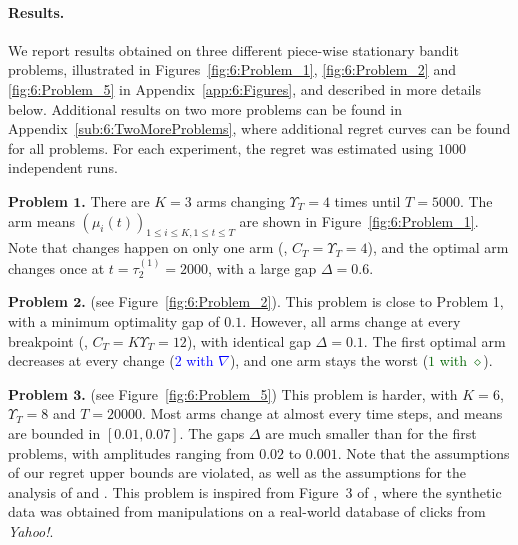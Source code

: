 \paragraph{Results.}
\label{sub:6:NumericalResults}

We report results obtained on three different piece-wise stationary bandit problems, illustrated in Figures~\ref{fig:6:Problem_1}, \ref{fig:6:Problem_2} and \ref{fig:6:Problem_5} in Appendix~\ref{app:6:Figures}, and described in more details below. Additional results on two more problems can be found in Appendix~\ref{sub:6:TwoMoreProblems}, where additional regret curves can be found for all problems. For each experiment, the regret was estimated using $1000$ independent runs.



\textbf{Problem $\bm 1$.} There are $K=3$ arms changing $\Upsilon_T=4$ times until $T=5000$.
The arm means $(\mu_i(t))_{1\leq i\leq K,1\leq t\leq T}$ are shown in Figure~\ref{fig:6:Problem_1}.
Note that changes happen on only one arm (\ie, $C_T=\Upsilon_T=4$),
and the optimal arm changes once at $t=\tau_2^{(1)}=2000$, with a large gap $\Delta=0.6$.


\textbf{Problem $\bm 2$.} (see Figure~\ref{fig:6:Problem_2}). This problem is close to Problem 1, with a minimum optimality gap of $0.1$.
However, all arms change at every breakpoint (\ie, $C_T=K\Upsilon_T=12$), with identical gap $\Delta=0.1$.
The first optimal arm decreases at every change (\textcolor{blue}{$2$ with $\nabla$}), and one arm stays the worst (\textcolor{darkgreen}{$1$ with $\diamond$}).



\textbf{Problem $\bm 3$.} (see Figure~\ref{fig:6:Problem_5}) This problem is harder, with $K=6$, $\Upsilon_T=8$ and $T=20000$.
Most arms change at almost every time steps,
and means are bounded in $[0.01, 0.07]$.
The gaps $\Delta$ are much smaller than for the first problems, with amplitudes ranging from $0.02$ to $0.001$.
Note that the assumptions of our regret upper bounds are violated, as well as the assumptions for the analysis of \MUCB{} and \CUSUMUCB.
This problem is inspired from Figure~3 of \cite{CaoZhenKvetonXie18}, where the synthetic data was obtained from manipulations on a real-world database of clicks from \emph{Yahoo!}.

